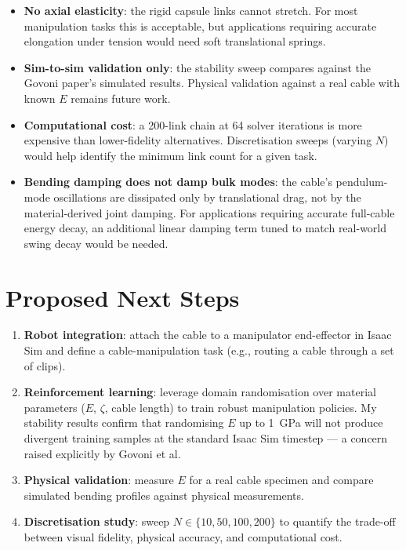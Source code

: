 \documentclass[11pt,a4paper]{article}
\begin{document}
\begin{itemize}[nosep]
    \item \textbf{No axial elasticity}: the rigid capsule links cannot stretch.
          For most manipulation tasks this is acceptable, but applications
          requiring accurate elongation under tension would need soft
          translational springs.
    \item \textbf{Sim-to-sim validation only}: the stability sweep compares
          against the Govoni paper's simulated results.  Physical validation
          against a real cable with known $E$ remains future work.
    \item \textbf{Computational cost}: a 200-link chain at 64 solver iterations
          is more expensive than lower-fidelity alternatives.
          Discretisation sweeps (varying $N$) would help identify the minimum
          link count for a given task.
    \item \textbf{Bending damping does not damp bulk modes}: the cable's
          pendulum-mode oscillations are dissipated only by translational drag,
          not by the material-derived joint damping.  For applications requiring
          accurate full-cable energy decay, an additional linear damping term
          tuned to match real-world swing decay would be needed.
\end{itemize}


\section{Proposed Next Steps}

\begin{enumerate}[nosep]
    \item \textbf{Robot integration}: attach the cable to a manipulator
          end-effector in Isaac Sim and define a cable-manipulation task
          (e.g., routing a cable through a set of clips).
    \item \textbf{Reinforcement learning}: leverage domain randomisation
          over material parameters ($E$, $\zeta$, cable length) to train
          robust manipulation policies.  My stability results confirm that
          randomising $E$ up to \SI{1}{GPa} will not produce divergent
          training samples at the standard Isaac Sim timestep --- a concern
          raised explicitly by Govoni et al.
    \item \textbf{Physical validation}: measure $E$ for a real cable specimen
          and compare simulated bending profiles against physical measurements.
    \item \textbf{Discretisation study}: sweep $N \in \{10, 50, 100, 200\}$
          to quantify the trade-off between visual fidelity, physical accuracy,
          and computational cost.
\end{enumerate}
\end{document}
